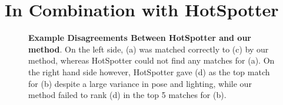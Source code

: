 



\section{In Combination with HotSpotter}

\begin{figure}[t]%
\centering
{}
\newline
{}
\caption{\textbf{Example Disagreements Between HotSpotter and our method}. On the left side, (a) was matched correctly to (c) by our method, whereas HotSpotter could not find any matches for (a). On the right hand side however, HotSpotter gave (d) as the top match for (b) despite a large variance in pose and lighting, while our method failed to rank (d) in the top 5 matches for (b).}
\label{fig:dis_proot}
\end{figure}

